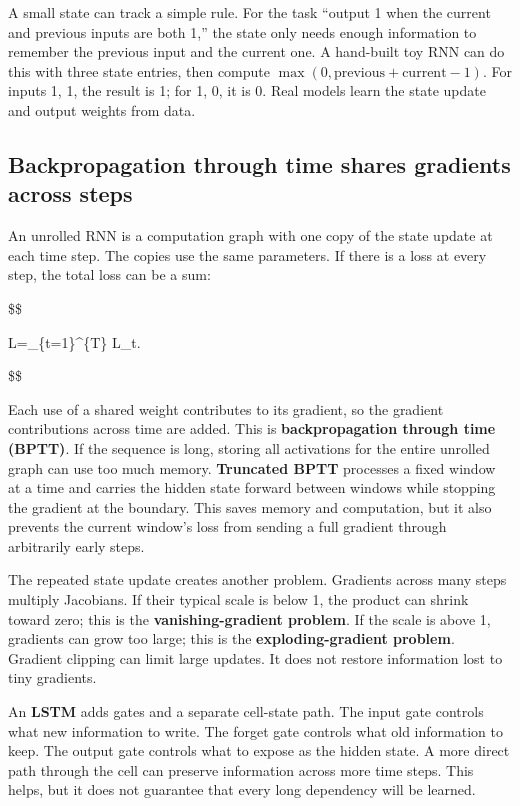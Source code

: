 A small state can track a simple rule. For the task ``output 1 when the current and previous inputs are both 1,'' the state only needs enough information to remember the previous input and the current one. A hand-built toy RNN can do this with three state entries, then compute \(\max(0,\text{previous}+\text{current}-1)\). For inputs 1, 1, the result is 1; for 1, 0, it is 0. Real models learn the state update and output weights from data.

\subsection{Backpropagation through time shares gradients across steps}\label{04-visual-computing-ii-ch031-backpropagation-through-time-shares-gradients-across-steps}

An unrolled RNN is a computation graph with one copy of the state update at each time step. The copies use the same parameters. If there is a loss at every step, the total loss can be a sum:

\$\$

L=\sum\_\{t=1\}\^{}\{T\} L\_t.

\$\$

Each use of a shared weight contributes to its gradient, so the gradient contributions across time are added. This is \textbf{backpropagation through time (BPTT)}. If the sequence is long, storing all activations for the entire unrolled graph can use too much memory. \textbf{Truncated BPTT} processes a fixed window at a time and carries the hidden state forward between windows while stopping the gradient at the boundary. This saves memory and computation, but it also prevents the current window's loss from sending a full gradient through arbitrarily early steps.

The repeated state update creates another problem. Gradients across many steps multiply Jacobians. If their typical scale is below 1, the product can shrink toward zero; this is the \textbf{vanishing-gradient problem}. If the scale is above 1, gradients can grow too large; this is the \textbf{exploding-gradient problem}. Gradient clipping can limit large updates. It does not restore information lost to tiny gradients.

An \textbf{LSTM} adds gates and a separate cell-state path. The input gate controls what new information to write. The forget gate controls what old information to keep. The output gate controls what to expose as the hidden state. A more direct path through the cell can preserve information across more time steps. This helps, but it does not guarantee that every long dependency will be learned.

